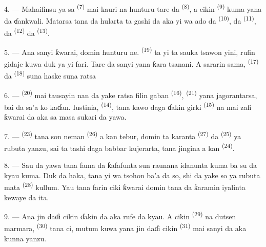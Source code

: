 4. --- Mahaifinsu ya sa  \textsuperscript{(7)}
mai kauri na hunturu tare da 
\textsuperscript{(8)}, a cikin  \textsuperscript{(9)}
kuma yana da ɗankwali. Matarsa tana da hularta ta gashi da aka yi wa
ado da  \textsuperscript{(10)}, da
 \textsuperscript{(11)}, da  \textsuperscript{(12)} da 
\textsuperscript{(13)}.

5. --- Ana sanyi ƙwarai, domin hunturu ne. 
\textsuperscript{(19)} ta yi ta sauka tsawon yini, rufin gidaje kuwa
duk ya yi fari. Tare da  sanyi yana ƙara tsanani. A
sararin sama,  \textsuperscript{(17)} da 
\textsuperscript{(18)} suna haske suna ratsa 

\VUsaut{4.2mm}
\VUsaut{3.0mm}

6. ---  \textsuperscript{(20)} mai tausayin nan da yake
ratsa filin gaban  \textsuperscript{(16)},
 \textsuperscript{(21)} yana jagorantarsa,
bai da sa’a ko kaɗan. Iustinia, 
\textsuperscript{(14)}, tana kawo daga ɗakin girki 
\textsuperscript{(15)} na  mai zafi ƙwarai da aka
sa masa sukari da yawa.

7. ---  \textsuperscript{(23)} tana son neman
 \textsuperscript{(26)} a kan tebur,
domin ta karanta  \textsuperscript{(27)} da
 \textsuperscript{(25)} ya rubuta yanzu, sai ta tashi
daga babbar kujerarta, tana jingina a kan 
\textsuperscript{(24)}.

8. --- Sau da yawa tana fama da  ƙafafunta sun raunana idanunta kuma ba su da kyau
kuma. Duk da haka, tana yi wa tsohon  ba’a da so,
shi da yake so ya rubuta mata 
\textsuperscript{(28)} kullum. Yau tana farin ciki ƙwarai domin tana da
ƙaramin iyalinta kewaye da ita.

9. --- Ana jin daɗi cikin ɗakin da aka rufe da kyau. A cikin
 \textsuperscript{(29)} na dutsen marmara,
 \textsuperscript{(30)} tana ci, mutum kuwa yana
jin daɗi cikin   \textsuperscript{(31)}
mai sanyi da aka kunna yanzu.

